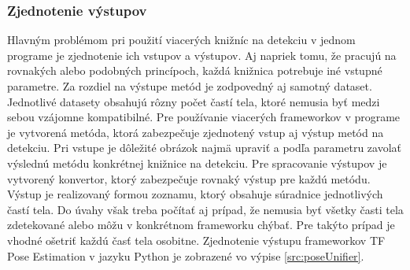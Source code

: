 \documentclass[slovak,master,dept460,male,cpp,cpdeclaration]{diploma}
\begin{document}
\subsubsection*{Zjednotenie výstupov}
	\label{sec:intersect}
Hlavným problémom pri použití viacerých knižníc na detekciu v jednom programe  je zjednotenie  ich vstupov a výstupov. Aj napriek tomu, že pracujú na rovnakých alebo podobných princípoch, každá knižnica potrebuje iné vstupné parametre. Za rozdiel na výstupe metód je zodpovedný aj samotný dataset. Jednotlivé datasety obsahujú rôzny počet častí tela, ktoré nemusia  byť medzi sebou vzájomne kompatibilné. Pre  používanie viacerých frameworkov v programe je vytvorená  metóda, ktorá  zabezpečuje zjednotený vstup aj výstup metód na detekciu. Pri vstupe je dôležité obrázok najmä upraviť a podľa parametru zavolať výslednú metódu  konkrétnej knižnice na detekciu. Pre spracovanie  výstupov je  vytvorený konvertor, ktorý zabezpečuje  rovnaký výstup pre každú metódu. Výstup je realizovaný formou zoznamu, ktorý obsahuje súradnice  jednotlivých častí tela.  Do úvahy však treba počítať aj prípad, že nemusia byť všetky časti tela zdetekované alebo môžu v konkrétnom frameworku chýbať. Pre takýto prípad je vhodné ošetriť každú časť  tela osobitne. Zjednotenie výstupu frameworkov TF Pose Estimation v jazyku Python je zobrazené vo výpise \ref{src:poseUnifier}.

\newpage

\end{document}
